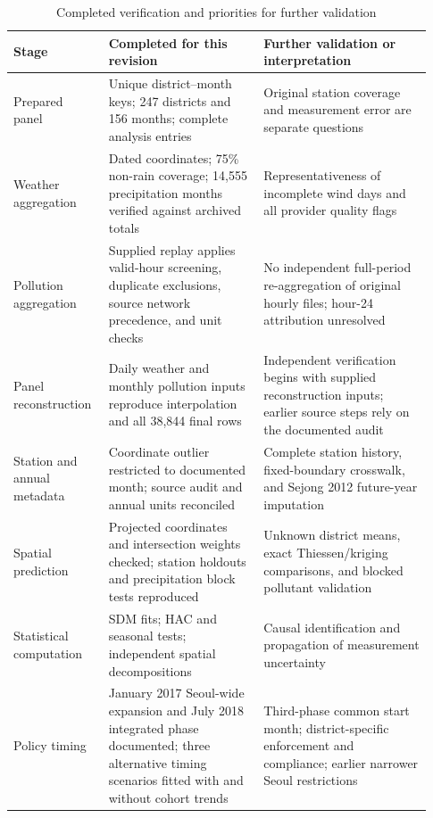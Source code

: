 \begin{table}[htbp]
\centering
\caption{Completed verification and priorities for further validation}
\label{tab:s_validation}
\singlespacing\footnotesize
\setlength{\tabcolsep}{5pt}
\renewcommand{\arraystretch}{1.08}
\begin{tabular}{@{}>{\raggedright\arraybackslash}p{0.20\linewidth}>{\raggedright\arraybackslash}p{0.35\linewidth}>{\raggedright\arraybackslash}p{0.38\linewidth}@{}}
\toprule
Stage & Completed for this revision & Further validation or interpretation\\
\midrule
Prepared panel & Unique district--month keys; 247 districts and 156 months; complete analysis entries & Original station coverage and measurement error are separate questions\\
Weather aggregation & Dated coordinates; 75\% non-rain coverage; 14,555 precipitation months verified against archived totals & Representativeness of incomplete wind days and all provider quality flags\\
Pollution aggregation & Supplied replay applies valid-hour screening, duplicate exclusions, source network precedence, and unit checks & No independent full-period re-aggregation of original hourly files; hour-24 attribution unresolved\\
Panel reconstruction & Daily weather and monthly pollution inputs reproduce interpolation and all 38,844 final rows & Independent verification begins with supplied reconstruction inputs; earlier source steps rely on the documented audit\\
Station and annual metadata & Coordinate outlier restricted to documented month; source audit and annual units reconciled & Complete station history, fixed-boundary crosswalk, and Sejong 2012 future-year imputation\\
Spatial prediction & Projected coordinates and intersection weights checked; station holdouts and precipitation block tests reproduced & Unknown district means, exact Thiessen/kriging comparisons, and blocked pollutant validation\\
Statistical computation & 131 SDM fits; HAC and seasonal tests; independent spatial decompositions & Causal identification and propagation of measurement uncertainty\\
Policy timing & January 2017 Seoul-wide expansion and July 2018 integrated phase documented; three alternative timing scenarios fitted with and without cohort trends & Third-phase common start month; district-specific enforcement and compliance; earlier narrower Seoul restrictions\\
\bottomrule
\end{tabular}
\end{table}
